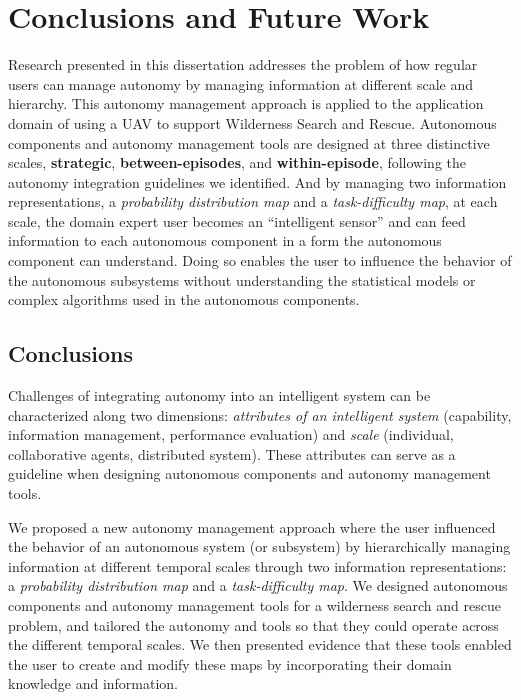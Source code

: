 \chapter[Conclusions and Future Work]{Conclusions and Future Work}
\label{chap:Conclusions}

Research presented in this dissertation addresses the problem of how regular users can manage autonomy by managing information at different scale and hierarchy. This autonomy management approach is applied to the application domain of using a UAV to support Wilderness Search and Rescue. Autonomous components and autonomy management tools are designed at three distinctive scales, \textbf{strategic}, \textbf{between-episodes}, and \textbf{within-episode}, following the autonomy integration guidelines we identified. And by managing two information representations, a \textit{probability distribution map} and a \textit{task-difficulty map}, at each scale, the domain expert user becomes an ``intelligent sensor'' and can feed information to each autonomous component in a form the autonomous component can understand. Doing so enables the user to influence the behavior of the autonomous subsystems without understanding the statistical models or complex algorithms used in the autonomous components.

\section{Conclusions}
\label{conclusions}

Challenges of integrating autonomy into an intelligent system can be characterized along two dimensions: \textit{attributes of an intelligent system} (capability, information management, performance evaluation) and \textit{scale} (individual, collaborative agents, distributed system). These attributes can serve as a guideline when designing autonomous components and autonomy management tools. 

We proposed a new autonomy management approach where the user influenced the behavior of an autonomous system (or subsystem) by hierarchically managing information at different temporal scales through two information representations:  a \textit{probability distribution map} and a \textit{task-difficulty map}. We designed autonomous components and autonomy management tools for a wilderness search and rescue problem, and tailored the autonomy and tools so that they could operate across the different temporal scales.  We then presented evidence that these tools enabled the user to create and modify these maps by incorporating their domain knowledge and information. 

